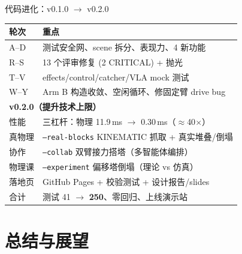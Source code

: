 \documentclass[aspectratio=169, 11pt]{beamer}
\begin{document}
\begin{frame}{代码进化：v0.1.0 $\to$ v0.2.0}
\centering\small
\begin{tabular}{ll}
\toprule
轮次 & 重点 \\
\midrule
A--D & 测试安全网、scene 拆分、表现力、4 新功能 \\
R--S & 13 个评审修复 (2 CRITICAL) + 抛光 \\
T--V & effects/control/catcher/VLA mock 测试 \\
W--Y & Arm B 构造收敛、空闲循环、修固定臂 drive bug \\
\midrule
\multicolumn{2}{l}{\textbf{v0.2.0（提升技术上限）}} \\
性能 & 三杠杆：物理 11.9\,ms $\to$ 0.30\,ms（$\approx$40$\times$） \\
真物理 & \texttt{--real-blocks} KINEMATIC 抓取 + 真实堆叠/倒塌 \\
协作 & \texttt{--collab} 双臂接力搭塔（多智能体编排） \\
物理课 & \texttt{--experiment} 偏移塔倒塌（理论 vs 仿真） \\
落地页 & GitHub Pages + 校验测试 + 设计报告/slides \\
\midrule
合计 & 测试 41 $\to$ \textbf{250}、零回归、上线演示站 \\
\bottomrule
\end{tabular}
\end{frame}

\section{总结与展望}
\end{document}
